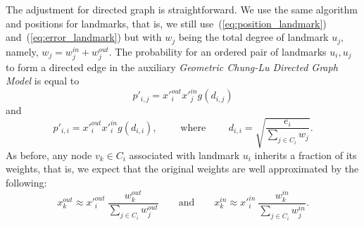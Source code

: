 The adjustment for directed graph is straightforward. We use the same algorithm and positions for landmarks, that is, we still use~(\ref{eq:position_landmark}) and~(\ref{eq:error_landmark}) but with $w_j$ being the total degree of landmark $u_j$, namely, $w_j = w_j^{in} + w_j^{out}$. The probability for an ordered pair of landmarks $u_i, u_j$ to form a directed edge in the auxiliary \emph{Geometric Chung-Lu Directed Graph Model} is equal to 
$$
p'_{i,j} = {x'}_i^{out} {x'}_j^{in} g(d_{i,j}) 
$$
and
$$
p'_{i,i} = {x'}_i^{out} {x'}_i^{in} g(d_{i,i}), \qquad \text{ where } \qquad d_{i,i} = \sqrt{ \frac{e_i}{\sum_{j \in C_i} w_j} }.
$$
As before, any node $v_k \in C_i$ associated with landmark $u_i$ inherits a fraction of its weights, that is, we expect that the original weights are well approximated by the following:
$$
x_k^{out} \approx {x'}_i^{out} \ \frac {w_k^{out}}{\sum_{j \in C_i} w_j^{out}} \qquad  \text{and} \qquad x_k^{in} \approx {x'}_i^{in} \ \frac {w_k^{in}}{\sum_{j \in C_i} w_j^{in}}.
$$
